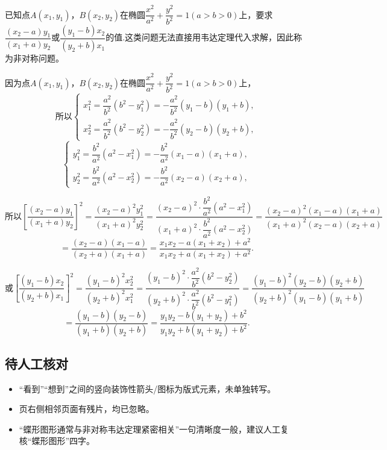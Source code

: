 \documentclass[UTF8,a4paper,11pt]{ctexart}
\begin{document}
已知点$A(x_1,y_1)$，$B(x_2,y_2)$在椭圆$\dfrac{x^2}{a^2}+\dfrac{y^2}{b^2}=1(a>b>0)$上，要求$\dfrac{(x_2-a)y_1}{(x_1+a)y_2}$或$\dfrac{(y_1-b)x_2}{(y_2+b)x_1}$的值.这类问题无法直接用韦达定理代入求解，因此称为非对称问题。

因为点$A(x_1,y_1)$，$B(x_2,y_2)$在椭圆$\dfrac{x^2}{a^2}+\dfrac{y^2}{b^2}=1(a>b>0)$上，
\[
\text{所以}\begin{cases}
 x_1^2=\dfrac{a^2}{b^2}(b^2-y_1^2)=-\dfrac{a^2}{b^2}(y_1-b)(y_1+b),\\
 x_2^2=\dfrac{a^2}{b^2}(b^2-y_2^2)=-\dfrac{a^2}{b^2}(y_2-b)(y_2+b),
\end{cases}
\]
\[
\begin{cases}
 y_1^2=\dfrac{b^2}{a^2}(a^2-x_1^2)=-\dfrac{b^2}{a^2}(x_1-a)(x_1+a),\\
 y_2^2=\dfrac{b^2}{a^2}(a^2-x_2^2)=-\dfrac{b^2}{a^2}(x_2-a)(x_2+a),
\end{cases}
\]

\[
\text{所以}\left[\dfrac{(x_2-a)y_1}{(x_1+a)y_2}\right]^2
=\dfrac{(x_2-a)^2y_1^2}{(x_1+a)^2y_2^2}
=\dfrac{(x_2-a)^2\cdot \dfrac{b^2}{a^2}(a^2-x_1^2)}{(x_1+a)^2\cdot \dfrac{b^2}{a^2}(a^2-x_2^2)}
=\dfrac{(x_2-a)^2(x_1-a)(x_1+a)}{(x_1+a)^2(x_2-a)(x_2+a)}
\]
\[
=\dfrac{(x_2-a)(x_1-a)}{(x_2+a)(x_1+a)}
=\dfrac{x_1x_2-a(x_1+x_2)+a^2}{x_1x_2+a(x_1+x_2)+a^2}.
\]

\[
\text{或}\left[\dfrac{(y_1-b)x_2}{(y_2+b)x_1}\right]^2
=\dfrac{(y_1-b)^2x_2^2}{(y_2+b)^2x_1^2}
=\dfrac{(y_1-b)^2\cdot \dfrac{a^2}{b^2}(b^2-y_2^2)}{(y_2+b)^2\cdot \dfrac{a^2}{b^2}(b^2-y_1^2)}
=\dfrac{(y_1-b)^2(y_2-b)(y_2+b)}{(y_2+b)^2(y_1-b)(y_1+b)}
\]
\[
=\dfrac{(y_1-b)(y_2-b)}{(y_1+b)(y_2+b)}
=\dfrac{y_1y_2-b(y_1+y_2)+b^2}{y_1y_2+b(y_1+y_2)+b^2}.
\]

\subsection*{待人工核对}

\begin{itemize}

\item “看到”“想到”之间的竖向装饰性箭头/图标为版式元素，未单独转写。

\item 页右侧相邻页面有残片，均已忽略。

\item “蝶形图形通常与非对称韦达定理紧密相关”一句清晰度一般，建议人工复核“蝶形图形”四字。

\end{itemize}
\end{document}
